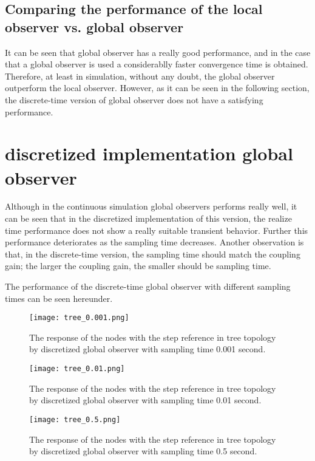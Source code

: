 \subsection{Comparing the performance of the local observer vs. global observer}
It can be seen that global observer has a really good performance, and in the case that a global observer is used a considerablly faster convergence time is obtained. Therefore, at least in simulation, without any doubt, the global observer outperform the local observer. However, as it can be seen in the following section, the discrete-time version of global observer does not have a satisfying performance.



\section{discretized implementation global observer}
Although in the continuous simulation global observers performs really well, it can be seen that in the discretized implementation of this version, the realize time performance does not show a really suitable transient behavior. Further this performance deteriorates as the sampling time decreases. Another observation is that, in the discrete-time version, the sampling time should match the coupling gain; the larger the coupling gain, the smaller should be sampling time.

The performance of the discrete-time global observer with different sampling times can be seen hereunder.
\begin{figure}[H] %
    \centering
    \texttt{[image: tree\_0.001.png]} %
    \caption{The response of the nodes with the step reference in tree topology by discretized global observer with sampling time 0.001 second.}
\end{figure}

\begin{figure}[H] %
    \centering
    \texttt{[image: tree\_0.01.png]} %
    \caption{The response of the nodes with the step reference in tree topology by discretized global observer with sampling time 0.01 second.}
\end{figure}

\begin{figure}[H] %
    \centering
    \texttt{[image: tree\_0.5.png]} %
    \caption{The response of the nodes with the step reference in tree topology by discretized global observer with sampling time 0.5 second.}
\end{figure}



